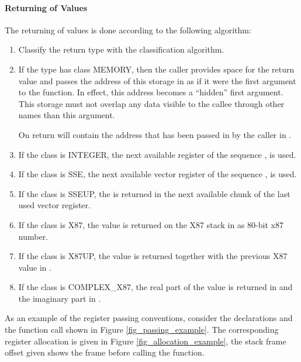 \paragraph{Returning of Values}
The returning of values is done according to the following algorithm:
\begin{enumerate}
\item Classify the return type with the classification algorithm.

\item If the type has class MEMORY, then the caller provides space for
   the return value and passes the address of this storage in \RDI as
   if it were the first argument to the function.  In effect, this
   address becomes a ``hidden'' first argument.  This storage must
   not overlap any data visible to the callee through other names
   than this argument.

   On return \RAX will contain the address that has been passed in by
   the caller in \RDI.

\item If the class is INTEGER, the next available register of the
   sequence \RAX, \RDX is used.

\item If the class is SSE, the next available vector register of the
   sequence ,  is used.

\item If the class is SSEUP, the \eightbyte is returned in the next
   available \eightbyte chunk of the last used vector register.

\item If the class is X87, the value is returned on the X87 stack in
    as 80-bit x87 number.

\item If the class is X87UP, the value is returned together with the
   previous X87 value in .
\item If the class is COMPLEX\_X87, the real part of the value is
  returned in  and the imaginary part in .
\end{enumerate}

As an example of the register passing conventions, consider the
declarations and the function call shown in
Figure \ref{fig_passing_example}.  The corresponding register
allocation is given in Figure \ref{fig_allocation_example}, the stack
frame offset given shows the frame before calling the function.

